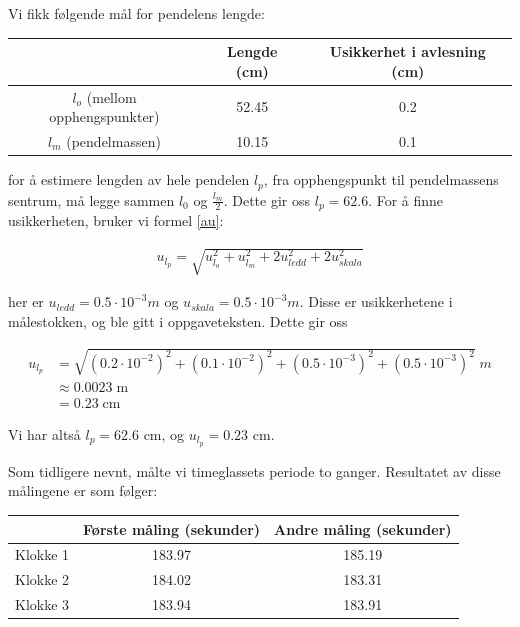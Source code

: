 Vi fikk følgende mål for pendelens lengde:

\begin{center}
\begin{tabular}{ | c | c | c | }
    \hline
    & Lengde (cm) & Usikkerhet i avlesning (cm)\\ 
    \hline
    $l_o$ (mellom opphengspunkter) & 52.45 & 0.2\\ 
    \hline
    $l_m$ (pendelmassen) & 10.15 & 0.1\\ 
    \hline
\end{tabular}
\end{center}

for å estimere lengden av hele pendelen $l_p$, fra opphengspunkt til pendelmassens sentrum, må legge sammen $l_0$ og $\frac{l_m}{2}$. Dette gir oss $l_p = 62.6$. For å finne usikkerheten, bruker vi formel \ref{au}:

\begin{align}
    u_{l_p} = \sqrt{u_{l_o}^2 + u_{l_m}^2 + 2u_{ledd}^2 + 2u_{skala}^2}
\end{align}

her er $u_{ledd} = 0.5 \cdot 10^{-3} m$ og $u_{skala} = 0.5 \cdot 10^{-3} m$. Disse er usikkerhetene i målestokken, og ble gitt i oppgaveteksten. Dette gir oss 

\begin{align*}
    u_{l_p} &= \sqrt{\left(0.2\cdot10^{-2}\right)^2 + \left(0.1\cdot10^{-2}\right)^2 + \left(0.5\cdot10^{-3} \right)^2 + \left(0.5\cdot10^{-3} \right)^2} \; m\\
    &\approx 0.0023 \; \text{m}\\
    &= 0.23 \; \text{cm}
\end{align*}

Vi har altså $l_p = 62.6$ cm, og $u_{l_p} = 0.23$ cm. \bigskip

Som tidligere nevnt, målte vi timeglassets periode to ganger. Resultatet av disse målingene er som følger: 

\begin{center}
\begin{tabular}{ | c | c | c | }
    \hline
    & Første måling (sekunder) & Andre måling (sekunder)\\ 
    \hline
    Klokke 1 & 183.97 & 185.19 \\ 
    \hline
    Klokke 2 & 184.02 & 183.31\\ 
    \hline
    Klokke 3 & 183.94 & 183.91 \\ 
    \hline
\end{tabular}
\end{center}

